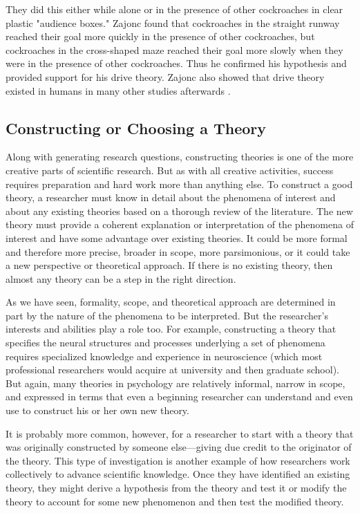 They did this either while alone or in the presence of other cockroaches in clear plastic "audience boxes." Zajonc found that cockroaches in the straight runway reached their goal more quickly in the presence of other cockroaches, but cockroaches in the cross-shaped maze reached their goal more slowly when they were in the presence of other cockroaches. Thus he confirmed his hypothesis and provided support for his drive theory. Zajonc also showed that drive theory existed in humans  in many other studies afterwards \citep{zajonc_social_1966}.

\subsection{Constructing or Choosing a Theory}

Along with generating research questions, constructing theories is one of the more creative parts of scientific research. But as with all creative activities, success requires preparation and hard work more than anything else. To construct a good theory, a researcher must know in detail about the phenomena of interest and about any existing theories based on a thorough review of the literature. The new theory must provide a coherent explanation or interpretation of the phenomena of interest and have some advantage over existing theories. It could be more formal and therefore more precise, broader in scope, more parsimonious, or it could take a new perspective or theoretical approach. If there is no existing theory, then almost any theory can be a step in the right direction.

As we have seen, formality, scope, and theoretical approach are determined in part by the nature of the phenomena to be interpreted. But the researcher's interests and abilities play a role too. For example, constructing a theory that specifies the neural structures and processes underlying a set of phenomena requires specialized knowledge and experience in neuroscience (which most professional researchers would acquire at university and then graduate school). But again, many theories in psychology are relatively informal, narrow in scope, and expressed in terms that even a beginning researcher can understand and even use to construct his or her own new theory.

It is probably more common, however, for a researcher to start with a theory that was originally constructed by someone else---giving due credit to the originator of the theory. This type of investigation is another example of how researchers work collectively to advance scientific knowledge. Once they have identified an existing theory, they might derive a hypothesis from the theory and test it or modify the theory to account for some new phenomenon and then test the modified theory.

